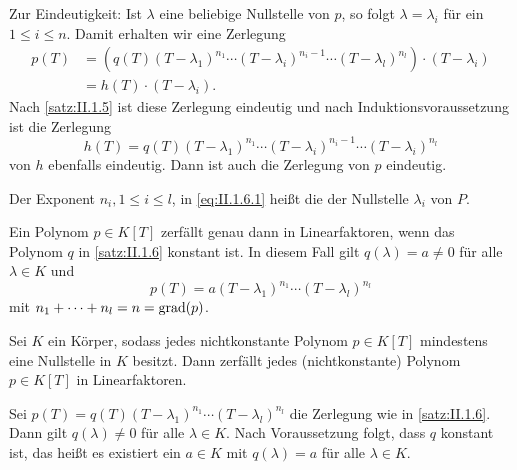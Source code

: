 \begin{beweis}
\begin{description}
		Zur Eindeutigkeit:
		Ist $\lambda$ eine beliebige Nullstelle von $p$, so folgt $\lambda = \lambda_i$ für ein $1 \leq i \leq n$.
		Damit erhalten wir eine Zerlegung
		\begin{align*}
			p(T) &= (q(T) (T-\lambda_1)^{n_1} \cdots (T-\lambda_i)^{n_i-1} \cdots (T-\lambda_l)^{n_l})\cdot (T-\lambda_i) \\
			&= h(T) \cdot (T-\lambda_i).
		\end{align*}
		Nach \autoref{satz:II.1.5} ist diese Zerlegung eindeutig und nach Induktionsvoraussetzung ist die Zerlegung
		\[
			h(T) = q(T) (T-\lambda_1)^{n_1} \cdots (T-\lambda_i)^{n_i-1} \cdots (T-\lambda_i)^{n_l}
		\]
		von $h$ ebenfalls eindeutig.
		Dann ist auch die Zerlegung von $p$ eindeutig. \qedhere
	\end{description}
\end{beweis}

\begin{definition}
	\label{def:II.1.7}
	Der Exponent $n_i, 1 \leq i \leq l$, in \eqref{eq:II.1.6.1} heißt die  der Nullstelle $\lambda_i$ von $P$.
\end{definition}

\begin{bemerkung}
	\label{bem:II.1.8}
	Ein Polynom $p \in K[T]$ zerfällt genau dann in Linearfaktoren, wenn das Polynom $q$ in \autoref{satz:II.1.6} konstant ist.
	In diesem Fall gilt $q(\lambda) = a \neq 0$ für alle $\lambda \in K$ und
	\[
		p(T) = a(T-\lambda_1)^{n_1} \cdots (T-\lambda_l)^{n_l}
	\]
	mit $n_1+\cdots+n_l = n = \operatorname{grad}(p)$.
\end{bemerkung}

\begin{korollar}
	\label{kor:II.1.9}
	Sei $K$ ein Körper, sodass jedes nichtkonstante Polynom $p \in K[T]$ mindestens eine Nullstelle in $K$ besitzt.
	Dann zerfällt jedes (nichtkonstante) Polynom $p \in K[T]$ in Linearfaktoren.
\end{korollar}

\begin{beweis}
	Sei $p(T) = q(T)(T-\lambda_1)^{n_1} \cdots (T-\lambda_l)^{n_l}$ die Zerlegung wie in \autoref{satz:II.1.6}.
	Dann gilt $q(\lambda) \neq 0$ für alle $\lambda \in K$.
	Nach Voraussetzung folgt, dass $q$ konstant ist, das heißt es existiert ein $a \in K$ mit $q(\lambda) = a$ für alle $\lambda \in K$. \qedhere
\end{beweis}

